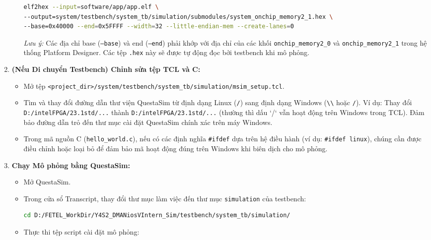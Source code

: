 \begin{enumerate}
\begin{itemize}
\begin{lstlisting}[language=bash, caption={Command to generate .hex file from .elf}]
elf2hex --input=software/app/app.elf \
--output=system/testbench/system_tb/simulation/submodules/system_onchip_memory2_1.hex \
--base=0x40000 --end=0x5FFFF --width=32 --little-endian-mem --create-lanes=0
            \end{lstlisting}
            \textit{Lưu ý:} Các địa chỉ base (\texttt{--base}) và end (\texttt{--end}) phải khớp với địa chỉ của các khối \texttt{onchip\_memory2\_0} và \texttt{onchip\_memory2\_1} trong hệ thống Platform Designer. Các tệp \texttt{.hex} này sẽ được tự động đọc bởi testbench khi mô phỏng.
        \end{itemize}
    \item \textbf{(Nếu Di chuyển Testbench) Chỉnh sửa tệp TCL và C:}
        \begin{itemize}
            \item Mở tệp \texttt{<project\_dir>/system/testbench/system\_tb/simulation/msim\_setup.tcl}.
            \item Tìm và thay đổi đường dẫn thư viện QuestaSim từ định dạng Linux (\texttt{/}) sang định dạng Windows (\texttt{\textbackslash\textbackslash} hoặc \texttt{/}). Ví dụ: Thay đổi \texttt{D:/intelFPGA/23.1std/...} thành \texttt{D:/intelFPGA/23.1std/...} (thường thì dấu `/` vẫn hoạt động trên Windows trong TCL). Đảm bảo đường dẫn trỏ đến thư mục cài đặt QuestaSim chính xác trên máy Windows.
            \item Trong mã nguồn C (\texttt{hello\_world.c}), nếu có các định nghĩa \texttt{\#ifdef} dựa trên hệ điều hành (ví dụ: \texttt{\#ifdef linux}), chúng cần được điều chỉnh hoặc loại bỏ để đảm bảo mã hoạt động đúng trên Windows khi biên dịch cho mô phỏng.
        \end{itemize}
    \item \textbf{Chạy Mô phỏng bằng QuestaSim:}
        \begin{itemize}
            \item Mở QuestaSim.
            \item Trong cửa sổ Transcript, thay đổi thư mục làm việc đến thư mục \texttt{simulation} của testbench:
            \begin{lstlisting}[language=bash, caption={Setup QuestaSim environment}]
cd D:/FETEL_WorkDir/Y4S2_DMANiosVIntern_Sim/testbench/system_tb/simulation/
            \end{lstlisting}
            \item Thực thi tệp script cài đặt mô phỏng:
            \begin{lstlisting}[language=bash, caption={Run QuestaSim setup script}]

\end{lstlisting}
\end{itemize}
\end{enumerate}
